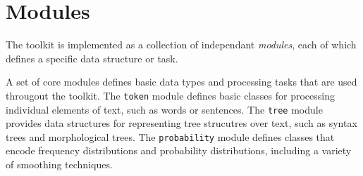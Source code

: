 \documentclass[11pt]{article}
\begin{document}


\section{Modules}

The toolkit is implemented as a collection of independant
\emph{modules}, each of which defines a specific data structure or
task.  

A set of core modules defines basic data types and processing tasks
that are used througout the toolkit.  The \texttt{token} module
defines basic classes for processing individual elements of text, such
as words or sentences.  The \texttt{tree} module provides data
structures for representing tree strucutres over text, such as syntax
trees and morphological trees.  The \texttt{probability} module
defines classes that encode frequency distributions and probability
distributions, including a variety of smoothing techniques.
\end{document}
